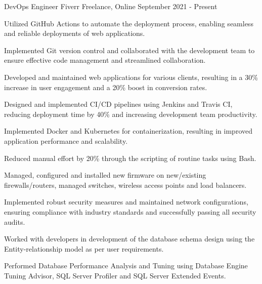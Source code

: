 \begin{cventries}
  \cventry
    {DevOps Engineer} %
    {Fiverr} %
    {Freelance, Online} %
    {September 2021 - Present} %
    {
      \begin{cvitems} %
        \item {Utilized GitHub Actions to automate the deployment process, enabling seamless and reliable deployments of web applications.}
        \item {Implemented Git version control and collaborated with the development team to ensure effective code management and streamlined collaboration.}
        \item {Developed and maintained web applications for various clients, resulting in a 30\% increase in user engagement and a 20\% boost in conversion rates.}
        \item {Designed and implemented CI/CD pipelines using Jenkins and Travis CI, reducing deployment time by 40\% and increasing development team productivity.}
        \item {Implemented Docker and Kubernetes for containerization, resulting in improved application performance and scalability.}
        \item {Reduced manual effort by 20\% through the scripting of routine tasks using Bash.}
        \item {Managed, configured and installed new firmware on new/existing firewalls/routers, managed switches, wireless access points and load balancers.}
        \item {Implemented robust security measures and maintained network configurations, ensuring compliance with industry standards and successfully passing all security audits.}
        \item {Worked with developers in development of the database schema design using the Entity-relationship model as per user requirements.}
        \item {Performed Database Performance Analysis and Tuning using Database Engine Tuning Advisor, SQL Server Profiler and SQL Server Extended Events.}

\end{cvitems}}
\end{cventries}
